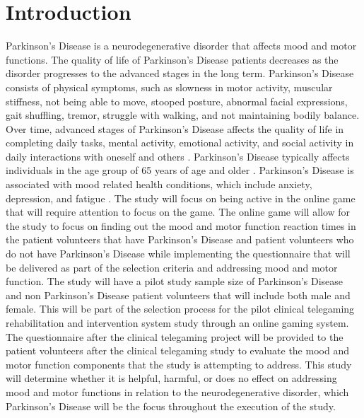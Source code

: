 \documentclass[12pt,letterpaper]{article}
\begin{document}
\section{Introduction}
 Parkinson's Disease is a neurodegenerative disorder that affects mood and motor functions. The quality of life of Parkinson's Disease patients decreases as the disorder progresses to the advanced stages in the long term. Parkinson's Disease consists of physical symptoms, such as slowness in motor activity, muscular stiffness, not being able to move, stooped posture, abnormal facial expressions, gait shuffling, tremor, struggle with walking, and not maintaining bodily balance\cite{Jenkinson2011}. Over time, advanced stages of Parkinson's Disease affects the quality of life in completing daily tasks, mental activity, emotional activity, and social activity in daily interactions with oneself and others \cite{Jenkinson2011}. Parkinson's Disease typically affects individuals in the age group of 65 years of age and older \cite{Serrano-Duenas2008}. Parkinson's Disease is associated with mood related health conditions, which include anxiety, depression, and fatigue \cite{Wang2014}. The study will focus on being active in the online game that will require attention to focus on the game. The online game will allow for the study to focus on finding out the mood and motor function reaction times in the patient volunteers that have Parkinson's Disease and patient volunteers who do not have Parkinson's Disease while implementing the questionnaire that will be delivered as part of the selection criteria and addressing mood and motor function. The study will have a pilot study sample size of Parkinson's Disease and non Parkinson's Disease patient volunteers that will include both male and female. This will be part of the selection process for the pilot clinical telegaming rehabilitation and intervention system study through an online gaming system. The questionnaire after the clinical telegaming project will be provided to the patient volunteers after the clinical telegaming study to evaluate the mood and motor function components that the study is attempting to address. This study will determine whether it is helpful, harmful, or does no effect on addressing mood and motor functions in relation to the neurodegenerative disorder, which Parkinson's Disease will be the focus throughout the execution of the study.
 
\end{document}
